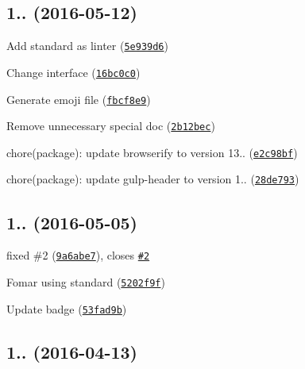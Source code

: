 \label{_1.0.3}%
 \subsection*{1.. (2016-\/05-\/12)}


\begin{DoxyItemize}
\item Add standard as linter (\href{https://github.com/kikobeats/emojis-list/commit/5e939d6}{\tt 5e939d6})
\item Change interface (\href{https://github.com/kikobeats/emojis-list/commit/16bc0c0}{\tt 16bc0c0})
\item Generate emoji file (\href{https://github.com/kikobeats/emojis-list/commit/fbcf8e9}{\tt fbcf8e9})
\item Remove unnecessary special doc (\href{https://github.com/kikobeats/emojis-list/commit/2b12bec}{\tt 2b12bec})
\item chore(package)\+: update browserify to version 13.. (\href{https://github.com/kikobeats/emojis-list/commit/e2c98bf}{\tt e2c98bf})
\item chore(package)\+: update gulp-\/header to version 1.. (\href{https://github.com/kikobeats/emojis-list/commit/28de793}{\tt 28de793})
\end{DoxyItemize}

\label{_1.0.2}%
 \subsection*{1.. (2016-\/05-\/05)}


\begin{DoxyItemize}
\item fixed \#2 (\href{https://github.com/kikobeats/emojis-list/commit/9a6abe7}{\tt 9a6abe7}), closes \href{https://github.com/kikobeats/emojis-list/issues/2}{\tt \#2}
\item Fomar using standard (\href{https://github.com/kikobeats/emojis-list/commit/5202f9f}{\tt 5202f9f})
\item Update badge (\href{https://github.com/kikobeats/emojis-list/commit/53fad9b}{\tt 53fad9b})
\end{DoxyItemize}

\label{_1.0.1}%
 \subsection*{1.. (2016-\/04-\/13)}


